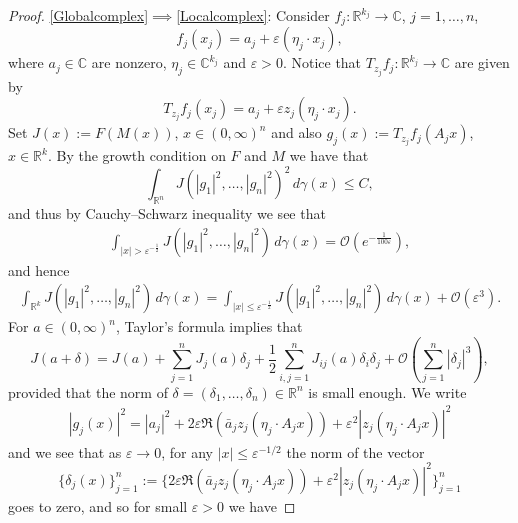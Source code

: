 \documentclass[9pt, a4paper]{amsart}
\newcommand{\R}{\mathbb{R}}
\newcommand{\C}{\mathbb{C}}
\newcommand{\1}{{\chi_{}}}%
\numberwithin{equation}{section}
\begin{document}
\begin{proof}
\eqref{Globalcomplex}$\implies$\eqref{Localcomplex}:		Consider  $f_j:\R^{k_j}\to\C$, $j=1,\ldots,n$, 
		\begin{equation*}
			f_j(x_j) = a_j+\varepsilon (\eta_j\cdot x_j),
		\end{equation*}
		where $a_j\in \mathbb{C}$ are nonzero, $\eta_j\in\C^{k_j}$ and  $\varepsilon >0$. Notice that   $T_{z_j}f_j:\R^{k_j}\to\C$ are given by
		\begin{equation*}
			T_{z_j} f_j(x_j)= a_j+\varepsilon z_j(\eta_j\cdot x_j).
		\end{equation*}
		Set $J(x):=F(M(x))$, $x\in(0,\infty)^n$ and also $g_j(x):=T_{z_j} f_j(A_jx)$, $x\in\R^k$. By the growth condition on $F$ and $M$ we have  that
		\begin{equation*}
			\int_{\R^n}J(|g_1|^2,\ldots,|g_n|^2)^2\,d\gamma(x)\leq C,
		\end{equation*}
		and thus by Cauchy--Schwarz inequality we see that
		\begin{align*}
			\int_{| x|> \varepsilon^{-\frac{1}{2}}}J(|g_1|^{2},\ldots,|g_n|^2)\,d\gamma(x)=\mathcal{O}(e^{-\frac{1}{100\varepsilon}}),
		\end{align*}
		and hence 
		\begin{align*}
			\int_{\R^k}J(|g_1|^{2},\ldots,|g_n|^2)\,d\gamma(x)=\int_{| x|\leq \varepsilon^{-\frac{1}{2}}}J(|g_1|^{2},\ldots,|g_n|^2)\,d\gamma(x)+\mathcal{O}(\varepsilon^3).
		\end{align*}
		For $a\in (0,\infty)^{n}$, Taylor's formula implies that
		\begin{equation*}
			J(a+\delta) = J(a) + \sum_{j=1}^n J_j(a) \delta_j + \frac{1}{2} \sum_{ i,j=1}^{n} J_{ij}(a) \delta_i\delta_j + \mathcal{O}(\sum_{j=1}^n|\delta_j|^3),   
		\end{equation*}
		provided that the norm of $\delta=(\delta_1,\ldots,\delta_n)\in\R^n$ is small enough. We write
		\begin{align*}
			|g_j(x)|^2=|a_j|^2+2\varepsilon \Re(\bar{a}_jz_j(\eta_j\cdot A_jx))+\varepsilon^2|z_j(\eta_j\cdot A_j x)|^2
		\end{align*}
		and we see that as  $\varepsilon\to0$, for any $|x|\leq \varepsilon^{-1/2}$ the norm of the vector
		\begin{equation*}
			\{\delta_j(x)\}_{j=1}^n:=\{2\varepsilon \Re(\bar{a}_jz_j(\eta_j\cdot A_jx))+\varepsilon^2|z_j(\eta_j\cdot A_j x)|^2\}_{j=1}^n
		\end{equation*} 
		goes to zero,  and so for small $\varepsilon>0$   we have 
        

\end{proof}
\end{document}
